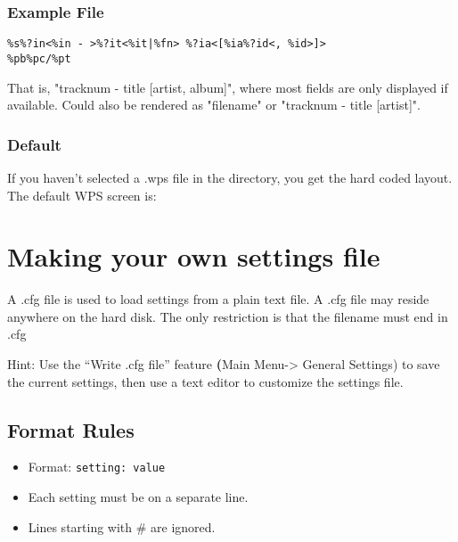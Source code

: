 \subsubsection{Example File}
\begin{verbatim}
%s%?in<%in - >%?it<%it|%fn> %?ia<[%ia%?id<, %id>]>
%pb%pc/%pt
\end{verbatim}
That is, "tracknum - title [artist, album]", where most fields are only displayed if available. Could also be rendered as "filename" or "tracknum - title [artist]".

\subsubsection{Default}
If you haven't selected a .wps file in the  directory, you get the hard coded layout. The default WPS screen is:


\section{\label{ref:SettingsFile}Making your own settings file}
A .cfg file is used to load settings from a plain text file. A .cfg file
may reside anywhere on the hard disk. The only restriction is that the
filename must end in .cfg

Hint: Use the ``Write .cfg file'' feature \textbf({Main Menu{}-{\textgreater} General Settings}) to save the current settings, then use a text editor to customize the settings file.

\subsection{Format Rules}

\begin{itemize}
\item Format: \verb+setting: value+
\item Each setting must be on a separate line.
\item Lines starting with \# are ignored.
\end{itemize}

